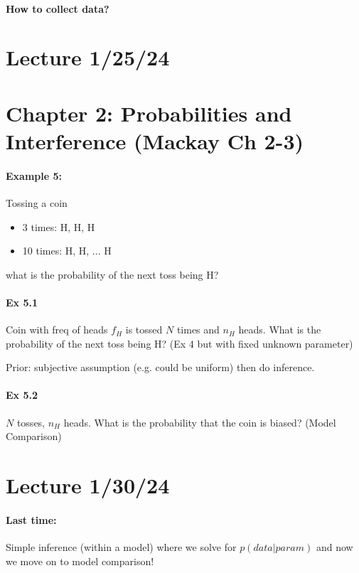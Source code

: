 \documentclass[../main.tex]{subfiles}
\begin{document}
\paragraph{How to collect data?}

\section*{Lecture 1/25/24}
\barh \vspace{10px}
\section{Chapter 2: Probabilities and Interference (Mackay Ch 2-3)}
\barh

\paragraph{Example 5:} Tossing a coin

\begin{itemize}
    \item 3 times: H, H, H
    \item 10 times: H, H, ... H
\end{itemize}
what is the probability of the next toss being H?

\paragraph{Ex 5.1} Coin with freq of heads $f_H$ is tossed $N$ times and $n_H$ heads. What is the 
probability of the next toss being H? (Ex 4 but with fixed unknown parameter)

Prior: subjective assumption (e.g. could be uniform) then do inference.

\paragraph{Ex 5.2} $N$ tosses, $n_H$ heads. What is the probability that the coin is biased?
(Model Comparison)

\pagebreak
\section*{Lecture 1/30/24}
\barh \vspace{10px}

\paragraph{Last time:} Simple inference (within a model) where we solve for $p(data | param)$ and
now we move on to model comparison!
\end{document}
